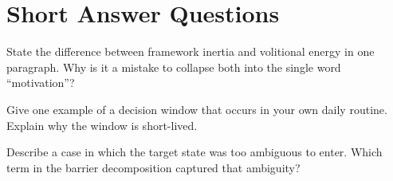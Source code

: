 \section{Short Answer Questions}

\begin{exercisebox}
\begin{exercise}
State the difference between framework inertia and volitional energy in one
paragraph. Why is it a mistake to collapse both into the single word
``motivation''?
\end{exercise}

\begin{exercise}
Give one example of a decision window that occurs in your own daily routine.
Explain why the window is short-lived.
\end{exercise}

\begin{exercise}
Describe a case in which the target state was too ambiguous to enter. Which
term in the barrier decomposition captured that ambiguity?
\end{exercise}
\end{exercisebox}
